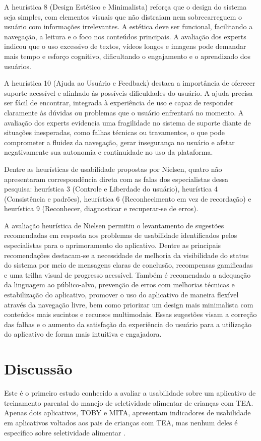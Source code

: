\documentclass[portuguese]{textolivre}
\begin{document}
A heurística 8 (Design Estético e Minimalista) reforça que o design do sistema seja simples, com elementos visuais que não distraiam nem sobrecarreguem o usuário com informações irrelevantes. A estética deve ser funcional, facilitando a navegação, a leitura e o foco nos conteúdos principais. A avaliação dos experts indicou que o uso excessivo de textos, vídeos longos e imagens pode demandar mais tempo e esforço cognitivo, dificultando o engajamento e o aprendizado dos usuários.

A heurística 10 (Ajuda ao Usuário e Feedback) destaca a importância de oferecer suporte acessível e alinhado às possíveis dificuldades do usuário. A ajuda precisa ser fácil de encontrar, integrada à experiência de uso e capaz de responder claramente às dúvidas ou problemas que o usuário enfrentará no momento. A avaliação dos experts evidencia uma fragilidade no sistema de suporte diante de situações inesperadas, como falhas técnicas ou travamentos, o que pode comprometer a fluidez da navegação, gerar insegurança no usuário e afetar negativamente sua autonomia e continuidade no uso da plataforma.

Dentre as heurísticas de usabilidade propostas por Nielsen, quatro não apresentaram correspondência direta com as falas dos especialistas dessa pesquisa: heurística 3 (Controle e Liberdade do usuário), heurística 4 (Consistência e padrões), heurística 6 (Reconhecimento em vez de recordação) e heurística 9 (Reconhecer, diagnosticar e recuperar-se de erros).

A avaliação heurística de Nielsen permitiu o levantamento de sugestões recomendadas em resposta aos problemas de usabilidade identificados pelos especialistas para o aprimoramento do aplicativo. Dentre as principais recomendações destacam-se a necessidade de melhoria da visibilidade do status do sistema por meio de mensagens claras de conclusão, recompensas gamificadas e uma trilha visual de progresso acessível. Também é recomendado a adequação da linguagem ao público-alvo, prevenção de erros com melhorias técnicas e estabilização do aplicativo, promover o uso do aplicativo de maneira flexível através da navegação livre, bem como priorizar um design mais minimalista com conteúdos mais sucintos e recursos multimodais. Essas sugestões visam a correção das falhas e o aumento da satisfação da experiência do usuário para a utilização do aplicativo de forma mais intuitiva e engajadora.

\section{Discussão}\label{sec-autores}
Este é o primeiro estudo conhecido a avaliar a usabilidade sobre um aplicativo de treinamento parental do manejo de seletividade alimentar de crianças com TEA. Apenas dois aplicativos, TOBY e MITA, apresentam indicadores de usabilidade em aplicativos voltados aos pais de crianças com TEA, mas nenhum deles é específico sobre seletividade alimentar \cite{bharat2023mhealth}.
\end{document}

